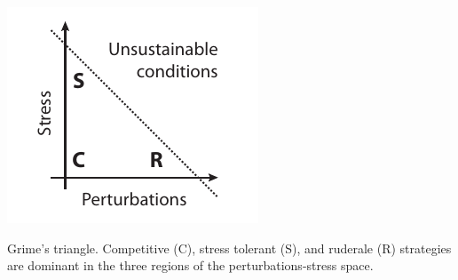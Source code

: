 \begin{marginfigure}
    \includegraphics{./Figures/Grime_triangle.pdf}
  \caption[Diversity insurance effect]{Grime's triangle. Competitive (C), stress tolerant (S), and ruderale (R) strategies are dominant in the three regions of the perturbations-stress space.}
  \label{fig:grime_triangle}
\end{marginfigure}

